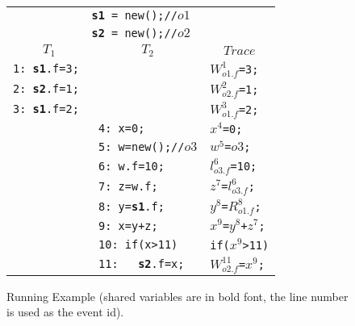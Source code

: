 \begin{figure}
{\small
\centering
\begin{tabular}{ll|l}
\multicolumn{3}{c}{{\tt {\bf s1} = new();//$o1$}} \\
\multicolumn{3}{c}{{\tt {\bf s2} = new();//$o2$}} \\
\multicolumn{1}{c}{$T_1$} & \multicolumn{1}{c}{$T_2$}  &  \multicolumn{1}{c}{$Trace$}\\
{\tt 1: {\bf s1}.f=3; } &  & {\tt $W^{1}_{o1.f}$=3;}\\
{\tt 2: {\bf s2}.f=1; } &  & {\tt $W^{2}_{o2.f}$=1;}\\
{\tt 3: {\bf s1}.f=2; } & & {\tt $W^{3}_{o1.f}$=2;} \\
& {\tt 4: x=0;} & {\tt $x^4$=0;}\\
& {\tt 5: w=new();//$o3$} & {\tt $w^5$=$o3$;}\\
& {\tt 6: w.f=10;}  & {\tt $l^6_{o3.f}$=10;}\\
& {\tt 7: z=w.f;} & {\tt $z^7$=$l^6_{o3.f}$;}\\
& {\tt 8: y={\bf s1}.f;} & {\tt $y^8$=$R^8_{o1.f}$;}\\
& {\tt 9: x=y+z;} & {\tt $x^9$=$y^8$+$z^7$;}\\
& {\tt 10: if(x>11)}& {\tt if($x^9$>11)}\\ 
& {\tt 11: \ \ {\bf s2}.f=x;}  & {\tt $W^{11}_{o2.f}$=$x^9$;}\\
\end{tabular}
\caption{Running Example (shared variables are in bold font, the line number is used as the event id). }
\label{fig:running2}
}
\end{figure}

 

